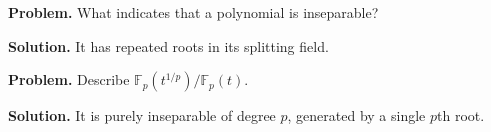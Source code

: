 \begin{example}\label{ex:sec5-9}
\textbf{Problem.} What indicates that a polynomial is inseparable?

\textbf{Solution.} It has repeated roots in its splitting field.
\end{example}

\begin{example}\label{ex:sec5-10}
\textbf{Problem.} Describe $\mathbb{F}_p(t^{1/p})/\mathbb{F}_p(t)$.

\textbf{Solution.} It is purely inseparable of degree $p$, generated by a single $p$th root.
\end{example}
